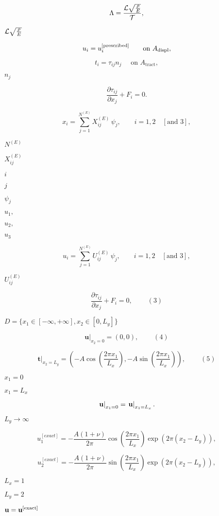 \documentclass{article}
\begin{document}
\[
\Lambda = \frac{{\cal L} \sqrt{\frac{\rho}{E}} }{\cal T},
\]
\pagebreak

$ {\cal L} \sqrt{\frac{\rho}{E}} $
\pagebreak

\[
u_i = u_i^{[\rm prescribed]} \ \ \ \ \ \ \mbox{on $A_{\mathrm{displ}}$},

\]
\pagebreak

\[
t_i = \tau_{ij} n_j \ \ \ \ \ \ \mbox{on $A_{\mathrm{tract}},$}
\]
\pagebreak

$ n_j $
\pagebreak

\[
\frac{\partial \tau_{ij}}{\partial x_j} + F_i = 0.
\]
\pagebreak

\[
x_i = \sum_{j=1}^{N^{(E)}} X^{(E)}_{ij} \, \psi_j, \qquad
i=1,2\quad [\mbox{and }3],
\]
\pagebreak

$ N^{(E)} $
\pagebreak

$ X^{(E)}_{ij} $
\pagebreak

$ i $
\pagebreak

$ j $
\pagebreak

$ \psi_j $
\pagebreak

$ u_1, $
\pagebreak

$ u_2, $
\pagebreak

$ u_3 $
\pagebreak

\[
u_i = \sum_{j=1}^{N^{(E)}} U^{(E)}_{ij} \, \psi_j, \qquad 
i=1,2\quad [\mbox{and }3],
\]
\pagebreak

$  U^{(E)}_{ij} $
\pagebreak

\[
\frac{\partial \tau_{ij}}{\partial x_j} + F_i=0,
 \ \ \ \ \ \ \ \ \ \ (3)
\]
\pagebreak

$ D = \{x_1 \in [-\infty,+\infty], x_2 \in [0,L_y]\} $
\pagebreak

\[
\left. \mathbf{u}\right|_{x_2 = 0}=(0,0),
\ \ \ \ \ \ \ \ \ \ (4)
\]
\pagebreak

\[
\left. \mathbf{t}\right|_{x_2 = L_y}=\left(-A \cos{\left(\frac{2 \pi x_1}{L_x}\right)}, -A \sin{\left(\frac{2 \pi x_1}{L_x}\right)}\right),
\ \ \ \ \ \ \ \ \ \ (5)
\]
\pagebreak

$ x_1 = 0 $
\pagebreak

$ x_1 = L_x $
\pagebreak

\[
\left. {\bf u}\right|_{x_1=0} = \left.{\bf u}\right|_{x_1=L_x}.
\]
\pagebreak

$ L_y \to \infty $
\pagebreak

\[
u_1^{[exact]} = -\frac{A(1+\nu)}{2 \pi} 
\cos{\left(\frac{2 \pi x_1}{L_x}\right)} \exp{\left(2 \pi (x_2-L_y)\right)},
\]
\pagebreak

\[
u_2^{[exact]} = -\frac{A(1+\nu)}{2 \pi} 
\sin{\left(\frac{2 \pi x_1}{L_x}\right)} \exp{\left(2 \pi (x_2-L_y)\right)},
\]
\pagebreak

$ L_x = 1 $
\pagebreak

$ L_y=2 $
\pagebreak

$ {\bf u} = {\bf u}^{[\mathrm{exact}]} $
\pagebreak
\end{document}
